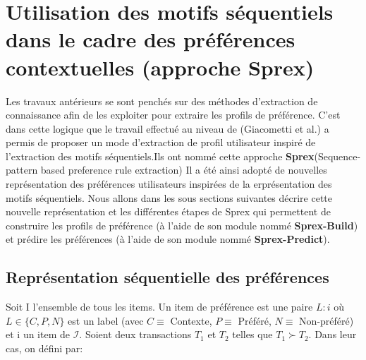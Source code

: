 \documentclass[a4paper,12pt,openany,oneside]{article}
\begin{document}
\section{Utilisation des motifs séquentiels dans le cadre des préférences contextuelles (approche Sprex)}

Les travaux antérieurs se sont penchés sur des méthodes d'extraction de connaissance afin de les exploiter pour extraire les profils de préférence.
C'est dans cette logique que le travail effectué au niveau de (Giacometti et al.) a permis de proposer un mode d'extraction de profil utilisateur inspiré de l'extraction des motifs séquentiels.Ils ont nommé cette approche \textbf{Sprex}(Sequence-pattern based preference rule extraction)
Il a été ainsi adopté de nouvelles représentation des préférences utilisateurs inspirées de la erprésentation des motifs séquentiels.
Nous allons dans les sous sections suivantes décrire cette nouvelle représentation et les différentes étapes de Sprex qui permettent de construire les profils de préférence (à l'aide de son module nommé \textbf{Sprex-Build}) et prédire les préférences (à l'aide de son module nommé \textbf{Sprex-Predict}). 

\subsection{Représentation séquentielle des préférences}
Soit I l'ensemble de tous les items. Un item de préférence est une paire $L:i$ où $L\in \{C,P,N\}$ est un label (avec $C\equiv $ Contexte, $P\equiv $ Préféré, $N\equiv $ Non-préféré) et i un item de $\mathcal{I}$.
Soient deux transactions $T_1$ et $T_2$ telles que $T_1\succ T_2$. Dans leur cas, on défini par:
\end{document}

